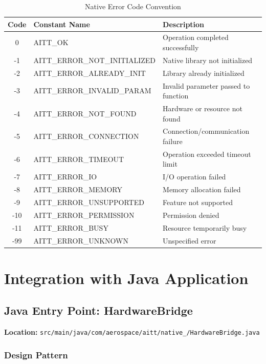 \documentclass[12pt,a4paper]{article}
\begin{document}
\begin{table}[h]
\centering
\begin{tabular}{|c|p{3cm}|p{6cm}|}
\hline
\textbf{Code} & \textbf{Constant Name} & \textbf{Description} \\
\hline
0 & AITT\_OK & Operation completed successfully \\
\hline
-1 & AITT\_ERROR\_NOT\_INITIALIZED & Native library not initialized \\
\hline
-2 & AITT\_ERROR\_ALREADY\_INIT & Library already initialized \\
\hline
-3 & AITT\_ERROR\_INVALID\_PARAM & Invalid parameter passed to function \\
\hline
-4 & AITT\_ERROR\_NOT\_FOUND & Hardware or resource not found \\
\hline
-5 & AITT\_ERROR\_CONNECTION & Connection/communication failure \\
\hline
-6 & AITT\_ERROR\_TIMEOUT & Operation exceeded timeout limit \\
\hline
-7 & AITT\_ERROR\_IO & I/O operation failed \\
\hline
-8 & AITT\_ERROR\_MEMORY & Memory allocation failed \\
\hline
-9 & AITT\_ERROR\_UNSUPPORTED & Feature not supported \\
\hline
-10 & AITT\_ERROR\_PERMISSION & Permission denied \\
\hline
-11 & AITT\_ERROR\_BUSY & Resource temporarily busy \\
\hline
-99 & AITT\_ERROR\_UNKNOWN & Unspecified error \\
\hline
\end{tabular}
\caption{Native Error Code Convention}
\end{table}

\newpage

\section{Integration with Java Application}

\subsection{Java Entry Point: HardwareBridge}

\textbf{Location:} \texttt{src/main/java/com/aerospace/aitt/native\_/HardwareBridge.java}

\subsubsection{Design Pattern}
\end{document}
